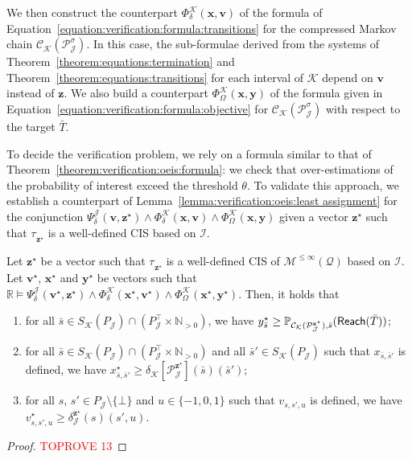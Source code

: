 \documentclass[a4paper,UKenglish,cleveref,autoref,thm-restate,colorlinks]{lipics-v2021}
\newcommand{\IR}{\mathbb{R}}
\newcommand{\IN}{\mathbb{N}}
\newcommand{\INpos}{\IN_{>0}}
\newcommand{\mdp}{\mathcal{M}}
\newcommand{\mdpStateSpace}{S}
\newcommand{\weightVal}{u}
\newcommand{\ocmdp}{\mathcal{Q}}
\newcommand{\ocmdpFin}[2]{\mdp^{\leq #2}(#1)}
\newcommand{\ocConfig}{s}
\newcommand{\ocTrans}{\delta}
\newcommand{\mchain}{\mathcal{C}}
\newcommand{\ocChain}{\mathcal{P}}
\newcommand{\intPart}{\mathcal{I}}
\newcommand{\intPartB}{\mathcal{J}}
\newcommand{\intPartC}{\mathcal{K}}
\newcommand{\cisChainStrat}[1]{\ocChain^{#1}_{\intPartB}}
\newcommand{\cisChain}{\cisChainStrat{\strat}}
\newcommand{\cisChainStateSpace}{P_{\intPartB}}
\newcommand{\cisChainStateSpaceStar}{P_{\intPartB}^{\top}}
\newcommand{\cisChainTransTemplate}[2]{\ocTrans_{#1}^{#2}}
\newcommand{\compressCis}{\mchain_{\intPartC}({\cisChain})}
\newcommand{\compressCisStateSpace}{\mdpStateSpace_{\intPartC}({\cisChainStateSpace})}
\newcommand{\cisConfig}{\bar{\ocConfig}}
\newcommand{\cisConfigB}{\bar{\ocConfig}'}
\newcommand{\varTrans}{x}
\newcommand{\varTransTuple}{\mathbf{\varTrans}}
\newcommand{\solTrans}{\varTrans^\star}
\newcommand{\solTransTuple}{\mathbf{\varTrans}^{\star}}
\newcommand{\varObj}{y}
\newcommand{\varObjTuple}{\mathbf{\varObj}}
\newcommand{\solObj}{\varObj^{\star}}
\newcommand{\solObjTuple}{\mathbf{\varObj}^{\star}}
\newcommand{\varStrat}{z}
\newcommand{\varStratTuple}{\mathbf{\varStrat}}
\newcommand{\solStratTuple}{\mathbf{\varStrat}^{\star}}
\newcommand{\varCis}{v}
\newcommand{\varCisTuple}{\mathbf{\varCis}}
\newcommand{\solCis}{\varCis^\star}
\newcommand{\solCisTuple}{\mathbf{\varCis}^\star}
\newcommand{\cisChainSymbSol}{\cisChainStrat{\solStratTuple}}
\newcommand{\compressCisSymbSol}{\mchain_{\intPartC}({\cisChainSymbSol})}
\newcommand{\cisChainTransSymbSol}{\cisChainTransTemplate{\intPartB}{\solStratTuple}}
\newcommand{\compressCisTransSymbSol}{\ocTrans_{\intPartC}[{\cisChainSymbSol}]}
\newcommand{\formulaTransBase}{\Phi_{\ocTrans}}
\newcommand{\formulaObjBase}{\Phi_{\objective}}
\newcommand{\formulaCisBase}{\Psi_{\ocTrans}}
\newcommand{\formulaCis}{\formulaCisBase^\intPartB}
\newcommand{\formulaCisTrans}{\formulaTransBase^\intPartC}
\newcommand{\formulaCisObj}{\formulaObjBase^\intPartC}
\newcommand{\objective}{\Omega}
\newcommand{\reach}[1]{\mathsf{Reach}(#1)}
\newcommand{\target}{T}
\newcommand{\thresProba}{\theta}
\newcommand{\stratGeneric}[1]{{\sigma_{#1}}}
\newcommand{\strat}{\stratGeneric{}}
\newcommand{\stratBGeneric}[1]{{\tau_{#1}}}
\newcommand{\stratB}{\stratBGeneric{}}
\begin{document}
We then construct the counterpart $\formulaCisTrans(\varTransTuple, \varCisTuple)$ of the formula of Equation~\eqref{equation:verification:formula:transitions} for the compressed Markov chain $\compressCis$.
In this case, the sub-formulae derived from the systems of Theorem~\ref{theorem:equations:termination} and Theorem~\ref{theorem:equations:transitions} for each interval of $\intPartC$ depend on $\varCisTuple$ instead of $\varStratTuple$.
We also build a counterpart $\formulaCisObj(\varTransTuple, \varObjTuple)$ of the formula given in Equation~\eqref{equation:verification:formula:objective} for $\compressCis$ with respect to the target $\bar{\target}$.

To decide the verification problem, we rely on a formula similar to that of Theorem~\ref{theorem:verification:oeis:formula}: we check that over-estimations of the probability of interest exceed the threshold $\thresProba$.
To validate this approach, we establish a counterpart of Lemma~\ref{lemma:verification:oeis:least assignment} for the conjunction $\formulaCis(\varCisTuple, \solStratTuple)\land\formulaCisTrans(\varTransTuple, \varCisTuple)\land\formulaCisObj(\varTransTuple,\varObjTuple)$ given a vector $\solStratTuple$ such that $\stratB_{\solStratTuple}$ is a well-defined CIS based on $\intPart$.

\begin{lemma}\label{lemma:verification:cis:least assignment}
  Let $\solStratTuple$ be a vector such that $\stratB_{\solStratTuple}$ is a well-defined CIS of $\ocmdpFin{\ocmdp}{\infty}$ based on $\intPart$.
  Let $\solCisTuple$, $\solTransTuple$ and $\solObjTuple$ be vectors such that $\IR\models\formulaCis(\solCisTuple, \solStratTuple)\land\formulaCisTrans(\solTransTuple, \solCisTuple)\land\formulaCisObj(\solTransTuple,\solObjTuple)$.
  Then, it holds that
  \begin{enumerate}
  \item for all $\cisConfig\in\compressCisStateSpace\cap(\cisChainStateSpaceStar\times\INpos)$, we have $\solObj_{\cisConfig}\geq\probaMCverb{\compressCisSymbSol}{\cisConfig}(\reach{\bar{\target}})$;\label{item:verification:cis:la:1}
  \item for all $\cisConfig\in\compressCisStateSpace\cap(\cisChainStateSpaceStar\times\INpos)$ and all $\cisConfigB\in\compressCisStateSpace$ such that $\varTrans_{\cisConfig, \cisConfigB}$ is defined, we have $\solTrans_{\cisConfig, \cisConfigB}\geq\compressCisTransSymbSol(\cisConfig)(\cisConfigB)$;\label{item:verification:cis:la:2}
  \item for all $\ocConfig$, $\ocConfig'\in\cisChainStateSpace\setminus\{\bot\}$ and $\weightVal\in\{-1, 0, 1\}$ such that $\varCis_{\ocConfig, \ocConfig',\weightVal}$ is defined, we have $\solCis_{\ocConfig, \ocConfig',\weightVal}\geq \cisChainTransSymbSol(\ocConfig)(\ocConfig', \weightVal)$.\label{item:verification:cis:la:3}
  \end{enumerate}
\end{lemma}
\begin{proof}\textcolor{red}{TOPROVE 13}\end{proof}
\end{document}
